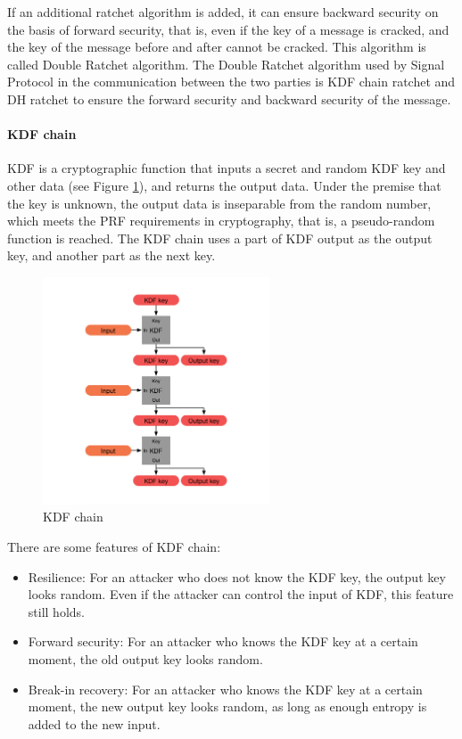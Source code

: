 \documentclass[11pt,en]{elegantpaper}
\begin{document}
If an additional ratchet algorithm is added, it can ensure backward security on the basis of forward security, that is, even if the key of a message is cracked, and the key of the message before and after cannot be cracked. This algorithm is called Double Ratchet algorithm. The Double Ratchet algorithm used by Signal Protocol in the communication between the two parties is KDF chain ratchet and DH ratchet to ensure the forward security and backward security of the message.

\paragraph{KDF chain}
KDF is a cryptographic function that inputs a secret and random KDF key and other data (see Figure \ref{kdfchain}), and returns the output data. Under the premise that the key is unknown, the output data is inseparable from the random number, which meets the PRF requirements in cryptography, that is, a pseudo-random function is reached. The KDF chain uses a part of KDF output as the output key, and another part as the next key\cite{bellare2017ratcheted}.

\begin{figure}[H]
    \centering
    \includegraphics[width=0.6\textwidth]{image/KDFchain}
    \caption{KDF chain}
    \label{kdfchain}
\end{figure}

There are some features of KDF chain:
\begin{itemize}
    \item Resilience: For an attacker who does not know the KDF key, the output key looks random. Even if the attacker can control the input of KDF, this feature still holds.
    \item Forward security: For an attacker who knows the KDF key at a certain moment, the old output key looks random.
    \item Break-in recovery: For an attacker who knows the KDF key at a certain moment, the new output key looks random, as long as enough entropy is added to the new input.
\end{itemize}
\end{document}
